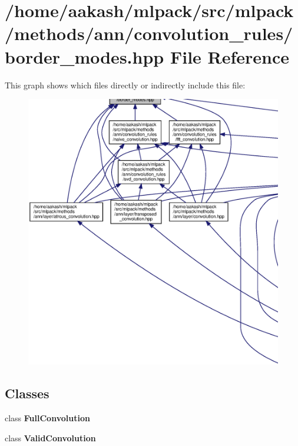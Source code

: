 \section{/home/aakash/mlpack/src/mlpack/methods/ann/convolution\+\_\+rules/border\+\_\+modes.hpp File Reference}
\label{border__modes_8hpp}
This graph shows which files directly or indirectly include this file\+:
\nopagebreak
\begin{figure}[H]
\begin{center}
\leavevmode
\includegraphics[width=350pt]{border__modes_8hpp__dep__incl}
\end{center}
\end{figure}
\subsection*{Classes}
\begin{DoxyCompactItemize}
\item 
class \textbf{ Full\+Convolution}
\item 
class \textbf{ Valid\+Convolution}
\end{DoxyCompactItemize}
